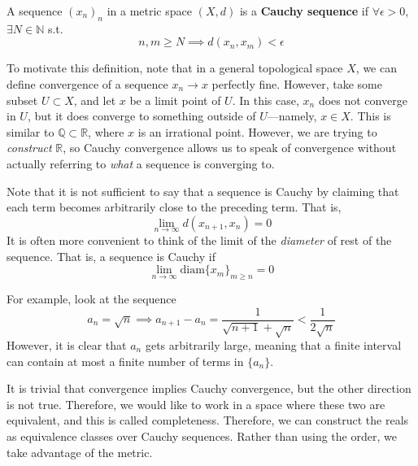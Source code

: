   \begin{definition}
    A sequence $(x_n)_n$ in a metric space $(X, d)$ is a \textbf{Cauchy sequence} if $\forall \epsilon > 0$, $\exists N \in \mathbb{N}$ s.t.  
    \begin{equation}
      n, m \geq N \implies d(x_n, x_m) < \epsilon
    \end{equation}
  \end{definition}

  To motivate this definition, note that in a general topological space $X$, we can define convergence of a sequence $x_n \to x$ perfectly fine. However, take some subset $U \subset X$, and let $x$ be a limit point of $U$. In this case, $x_n$ does not converge in $U$, but it does converge to something outside of $U$---namely, $x \in X$. This is similar to $\mathbb{Q} \subset \mathbb{R}$, where $x$ is an irrational point. However, we are trying to \textit{construct} $\mathbb{R}$, so Cauchy convergence allows us to speak of convergence without actually referring to \textit{what} a sequence is converging to. 

  Note that it is not sufficient to say that a sequence is Cauchy by claiming that each term becomes arbitrarily close to the preceding term. That is, 
  \begin{equation}
    \lim_{n \rightarrow \infty} d(x_{n+1}, x_{n}) = 0
  \end{equation}
  It is often more convenient to think of the limit of the \textit{diameter} of rest of the sequence. That is, a sequence is Cauchy if 
  \begin{equation}
    \lim_{n \rightarrow \infty} \mathrm{diam}\{x_{m}\}_{m \geq n} = 0
  \end{equation}

  \begin{example}
    For example, look at the sequence 
    \begin{equation}
      a_n = \sqrt{n} \implies a_{n+1} - a_{n} = \frac{1}{\sqrt{n+1} + \sqrt{n}} < \frac{1}{2\sqrt{n}}
    \end{equation}
    However, it is clear that $a_n$ gets arbitrarily large, meaning that a finite interval can contain at most a finite number of terms in $\{a_n\}$. 
  \end{example}

  It is trivial that convergence implies Cauchy convergence, but the other direction is not true. Therefore, we would like to work in a space where these two are equivalent, and this is called completeness. Therefore, we can construct the reals as equivalence classes over Cauchy sequences. Rather than using the order, we take advantage of the metric. 

